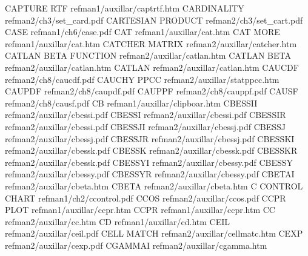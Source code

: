 CAPTURE RTF                             refman1/auxillar/captrtf.htm
CARDINALITY                             refman2/ch3/set_card.pdf
CARTESIAN PRODUCT                       refman2/ch3/set_cart.pdf
CASE                                    refman1/ch6/case.pdf
CAT                                     refman1/auxillar/cat.htm
CAT MORE                                refman1/auxillar/cat.htm
CATCHER MATRIX                          refman2/auxillar/catcher.htm
CATLAN BETA FUNCTION                    refman2/auxillar/catlan.htm
CATLAN BETA                             refman2/auxillar/catlan.htm
CATLAN                                  refman2/auxillar/catlan.htm
CAUCDF                                  refman2/ch8/caucdf.pdf
CAUCHY PPCC                             refman2/auxillar/statppcc.htm
CAUPDF                                  refman2/ch8/caupdf.pdf
CAUPPF                                  refman2/ch8/cauppf.pdf
CAUSF                                   refman2/ch8/causf.pdf
CB                                      refman1/auxillar/clipboar.htm
CBESSII                                 refman2/auxillar/cbessi.pdf
CBESSI                                  refman2/auxillar/cbessi.pdf
CBESSIR                                 refman2/auxillar/cbessi.pdf
CBESSJI                                 refman2/auxillar/cbessj.pdf
CBESSJ                                  refman2/auxillar/cbessj.pdf
CBESSJR                                 refman2/auxillar/cbessj.pdf
CBESSKI                                 refman2/auxillar/cbessk.pdf
CBESSK                                  refman2/auxillar/cbessk.pdf
CBESSKR                                 refman2/auxillar/cbessk.pdf
CBESSYI                                 refman2/auxillar/cbessy.pdf
CBESSY                                  refman2/auxillar/cbessy.pdf
CBESSYR                                 refman2/auxillar/cbessy.pdf
CBETAI                                  refman2/auxillar/cbeta.htm
CBETA                                   refman2/auxillar/cbeta.htm
C CONTROL CHART                         refman1/ch2/ccontrol.pdf
CCOS                                    refman2/auxillar/ccos.pdf
CCPR PLOT                               refman1/auxillar/ccpr.htm
CCPR                                    refman1/auxillar/ccpr.htm
CC                                      refman2/auxillar/cc.htm
CD                                      refman1/auxillar/cd.htm
CEIL                                    refman2/auxillar/ceil.pdf
CELL MATCH                              refman2/auxillar/cellmatc.htm
CEXP                                    refman2/auxillar/cexp.pdf
CGAMMAI                                 refman2/auxillar/cgamma.htm
